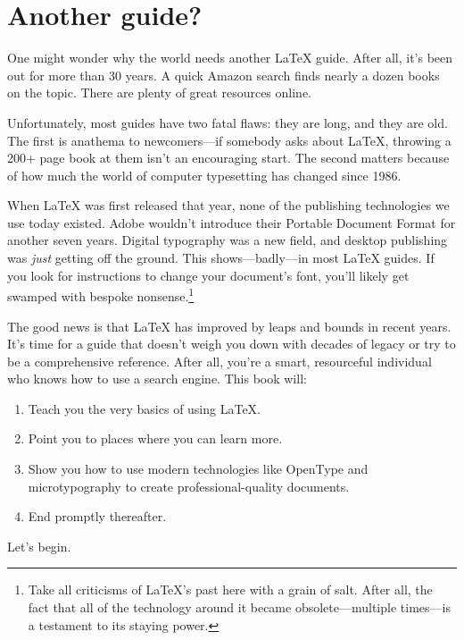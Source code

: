 \section{Another guide?}

One might wonder why the world needs another \LaTeX{} guide.
After all, it's been out for more than 30 years.
A quick Amazon search finds nearly a dozen books on the topic.
There are plenty of great resources online.

Unfortunately, most guides have two fatal flaws: they are long,
and they are old.
The first is anathema to newcomers---if somebody asks about \LaTeX{},
throwing a 200+ page book at them isn't an encouraging start.
The second matters because of how much the world of computer typesetting has
changed since 1986.

When \LaTeX{} was first released that year, none of the publishing technologies
we use today existed.
Adobe wouldn't introduce their Portable Document Format for another seven years.
Digital typography was a new field, and desktop publishing was \emph{just}
getting off the ground.\punckern{}
This shows---badly---in most \LaTeX{} guides.
If you look for instructions to change your document's font,
you'll likely get swamped with bespoke nonsense.\punckern\footnote{%
Take all criticisms of \LaTeX's past here with a grain of
salt. After all, the fact that all of the technology around it became
obsolete---multiple times---is a testament to its staying power.}

The good news is that  \LaTeX{} has improved by leaps and bounds in recent years.
It's time for a guide that doesn't weigh you down with decades of legacy
or try to be a comprehensive reference.
After all, you're a smart, resourceful individual who knows how to use a search
engine.
This book will:
\begin{enumerate}
\item Teach you the very basics of using \LaTeX.
\item Point you to places where you can learn more.
\item Show you how to use modern technologies like OpenType and microtypography
    to create professional-quality documents.
\item End promptly thereafter.
\end{enumerate}
Let's begin.

